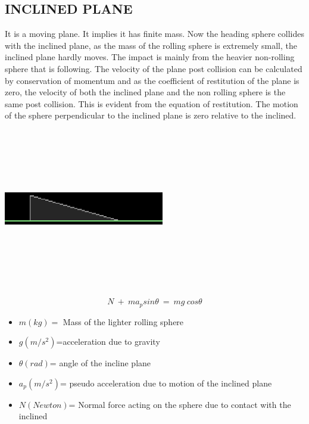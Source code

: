 \documentclass[11 pt]{article}
\begin{document}
\subsection{INCLINED PLANE}
It is a moving plane. It implies it has finite mass. Now the heading sphere collides with the inclined plane, as the mass of the rolling sphere is extremely small, the inclined plane hardly moves. The impact is mainly from the heavier non-rolling sphere that is following. The velocity of the plane post collision can be calculated by conservation of momentum and as the coefficient of restitution of the plane is zero, the velocity of both the inclined plane and the non rolling sphere is the same post collision.\cite{hcv} This is evident from the equation of restitution. The motion of the sphere perpendicular to the inclined plane is zero relative to the inclined.
\begin{center}\includegraphics[width=7cm, height=7cm]{inclined.eps}\end{center}
\begin{equation} N \: + \: m a_{p} sin \theta \: = \: m g \: cos \theta \end{equation}
\begin{itemize}
\item $m(kg)=$ Mass of the lighter rolling sphere   
\item $g(m/s^{2})$=acceleration due to gravity 
\item $\theta(rad)$= angle of the incline plane 
\item $a_{p}(m/s^{2})$= pseudo acceleration due to motion of the inclined plane
\item $N(Newton)$= Normal force acting on the sphere due to contact with the inclined 
\end{itemize}
\end{document}
